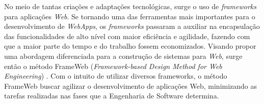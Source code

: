 No meio de tantas criações e adaptações tecnológicas, surge o uso de \textit{frameworks} para aplicações \textit{Web}. Se tornando uma das ferramentas mais importantes para o desenvolvimento de \textit{WebApps}, os \textit{frameworks} passaram a auxiliar na encapsulação das funcionalidades de alto nível com maior eficiência e agilidade, fazendo com que a maior parte do tempo e do trabalho fossem economizados. Visando propor uma abordagem diferenciada para a construção de sistemas para \textit{Web}, surge então o método FrameWeb (\textit{Framework-based Design Method for Web Engineering}) \cite{souza:masterthesis07}. Com o intuito de utilizar diversos frameworks, o método FrameWeb buscar agilizar o desenvolvimento de aplicações Web, minimizando as tarefas realizadas nas fases que a Engenharia de Software determina.  